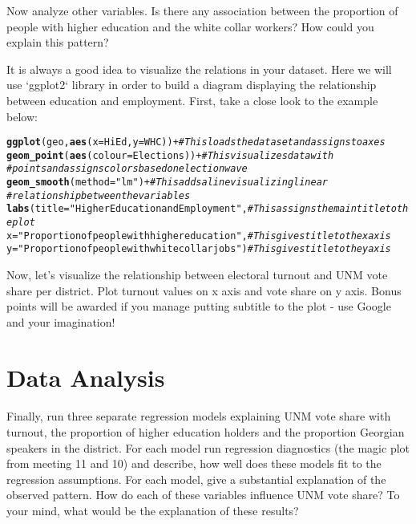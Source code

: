 \documentclass{article}\usepackage[]{graphicx}\usepackage[]{color}
\makeatletter
\newcommand{\hlstr}[1]{\textcolor[rgb]{0.192,0.494,0.8}{#1}}%
\newcommand{\hlcom}[1]{\textcolor[rgb]{0.678,0.584,0.686}{\textit{#1}}}%
\newcommand{\hlopt}[1]{\textcolor[rgb]{0,0,0}{#1}}%
\newcommand{\hlstd}[1]{\textcolor[rgb]{0.345,0.345,0.345}{#1}}%
\newcommand{\hlkwc}[1]{\textcolor[rgb]{0.333,0.667,0.333}{#1}}%
\newcommand{\hlkwd}[1]{\textcolor[rgb]{0.737,0.353,0.396}{\textbf{#1}}}%
\newenvironment{kframe}{%
 \def\at@end@of@kframe{}%
 \ifinner\ifhmode%
  \def\at@end@of@kframe{\end{minipage}}%
  \begin{minipage}{\columnwidth}%
 \fi\fi%
 \def\FrameCommand##1{\hskip\@totalleftmargin \hskip-\fboxsep
 \colorbox{shadecolor}{##1}\hskip-\fboxsep
     \hskip-\linewidth \hskip-\@totalleftmargin \hskip\columnwidth}%
 \MakeFramed {\advance\hsize-\width
   \@totalleftmargin\z@ \linewidth\hsize
   \@setminipage}}%
 {\par\unskip\endMakeFramed%
 \at@end@of@kframe}
\newenvironment{knitrout}{}{} %
\makeatother
\begin{document}
Now analyze other variables. Is there any association between the proportion of people with higher education and the white collar workers? How could you explain this pattern?

It is always a good idea to visualize the relations in your dataset. Here we will use `ggplot2` library in order to build a diagram displaying the relationship between education and employment. First, take a close look to the example below:

\begin{knitrout}
\color{fgcolor}\begin{kframe}
\begin{alltt}
\hlkwd{ggplot}\hlstd{(geo,} \hlkwd{aes}\hlstd{(}\hlkwc{x}\hlstd{=HiEd,} \hlkwc{y}\hlstd{=WHC))}\hlopt{+} \hlcom{# This loads the dataset and assigns to axes}
  \hlkwd{geom_point}\hlstd{(}\hlkwd{aes}\hlstd{(}\hlkwc{colour}\hlstd{=Elections))}\hlopt{+} \hlcom{# This visualizes data with }
\hlcom{# points and assigns colors based on election wave}
  \hlkwd{geom_smooth}\hlstd{(}\hlkwc{method}\hlstd{=}\hlstr{"lm"}\hlstd{)}\hlopt{+} \hlcom{# This adds a line visualizing linear}
\hlcom{# relationship between the variables}
  \hlkwd{labs}\hlstd{(}\hlkwc{title}\hlstd{=}\hlstr{"Higher Education and Employment"}\hlstd{,} \hlcom{# This assigns the main title to the plot}
       \hlkwc{x}\hlstd{=}\hlstr{"Proportion of people with higher education"}\hlstd{,} \hlcom{# This gives title to the x axis}
       \hlkwc{y} \hlstd{=}\hlstr{"Proportion of people with white collar jobs"}\hlstd{)} \hlcom{# This gives title to the y axis}
\end{alltt}
\end{kframe}
\end{knitrout}

Now, let's visualize the relationship between electoral turnout and UNM vote share per district. Plot turnout values on x axis and vote share on y axis. Bonus points will be awarded if you manage putting subtitle to the plot - use Google and your imagination!


\section*{Data Analysis}
\paragraph{}

Finally, run three separate regression models explaining UNM vote share with turnout, the proportion of higher education holders and the proportion Georgian speakers in the district. For each model run regression diagnostics (the magic plot from meeting 11 and 10) and describe, how well does these models fit to the regression assumptions. For each model, give a substantial explanation of the observed pattern. How do each of these variables influence UNM vote share? To your mind, what would be the explanation of these results?
\end{document}
